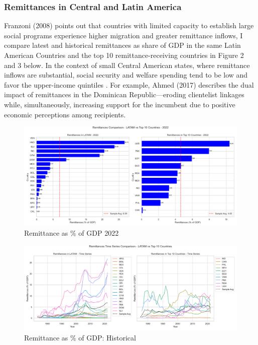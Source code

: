 \documentclass[
]{article}
\begin{document}
\hypertarget{remittances-in-central-and-latin-america}{%
\subsubsection{Remittances in Central and Latin
America}\label{remittances-in-central-and-latin-america}}

Franzoni (2008) points out that countries with limited capacity to
establish large social programs experience higher migration and greater
remittance inflows, I compare latest and historical remittances as share
of GDP in the same Latin American Countries and the top 10
remittance-receiving countries in Figure 2 and 3 below. In the context
of small Central American states, where remittance inflows are
substantial, social security and welfare spending tend to be low and
favor the upper-income quintiles . For example, Ahmed (2017) describes
the dual impact of remittances in the Dominican Republic---eroding
clientelist linkages while, simultaneously, increasing support for the
incumbent due to positive economic perceptions among recipients.

\begin{figure}
\hypertarget{fig:label}{%
\centering
\includegraphics[width=1\textwidth,height=1\textheight]{rem22_lat_top.png}
\caption{Remittance as \% of GDP 2022}\label{fig:label}
}
\end{figure}

\begin{figure}
\hypertarget{fig:label}{%
\centering
\includegraphics[width=1\textwidth,height=1\textheight]{remhist_lat_top.png}
\caption{Remittance as \% of GDP: Historical}\label{fig:label}
}
\end{figure}
\end{document}
